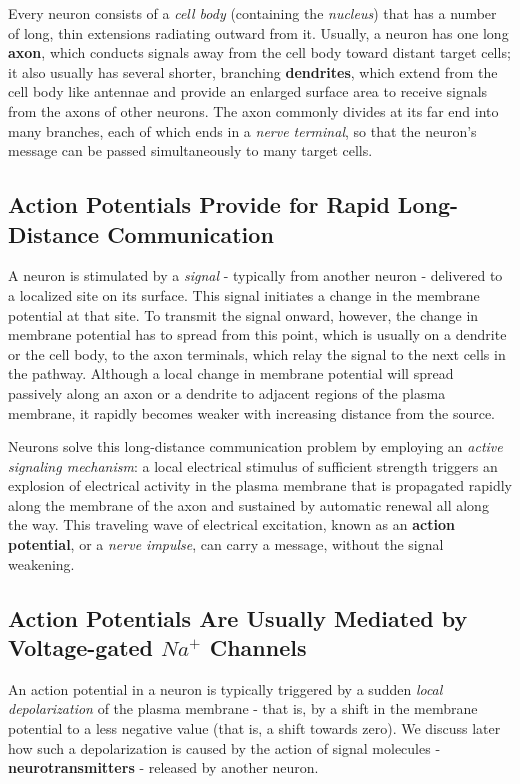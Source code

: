 Every neuron consists of a \textit{cell body} (containing the \textit{nucleus}) that has a
number of long, thin extensions radiating outward from it. Usually, a neuron
has one long \textbf{axon}, which conducts signals away from the cell body
toward distant target cells; it also usually has several shorter, branching
\textbf{dendrites}, which extend from the cell body like antennae and provide an
enlarged surface area to receive signals from the axons of other neurons.
The axon commonly divides at its far end into many
branches, each of which ends in a \textit{nerve terminal}, so that the neuron’s
message can be passed simultaneously to many target cells.

\subsection{Action Potentials Provide for Rapid Long-Distance Communication}

A neuron is stimulated by a \textit{signal} - typically from another neuron - delivered
to a localized site on its surface. This signal initiates a change in
the membrane potential at that site. To transmit the signal onward, however,
the change in membrane potential has to spread from this point,
which is usually on a dendrite or the cell body, to the axon terminals,
which relay the signal to the next cells in the pathway. Although a local
change in membrane potential will spread passively along an axon or a
dendrite to adjacent regions of the plasma membrane, it rapidly becomes
weaker with increasing distance from the source.

Neurons solve this long-distance communication problem by employing
an \textit{active signaling mechanism}: a local electrical stimulus of sufficient
strength triggers an explosion of electrical activity in the plasma membrane
that is propagated rapidly along the membrane of the axon and
sustained by automatic renewal all along the way. This traveling wave of
electrical excitation, known as an \textbf{action potential}, or a \textit{nerve impulse},
can carry a message, without the signal weakening.

\subsection{Action Potentials Are Usually Mediated by Voltage-gated $Na^{+}$ Channels}

An action potential in a neuron is typically triggered by a sudden \textit{local
depolarization} of the plasma membrane - that is, by a shift in the membrane
potential to a less negative value (that is, a shift towards zero). We
discuss later how such a depolarization is caused by the action of signal
molecules - \textbf{neurotransmitters} - released by another neuron. 

